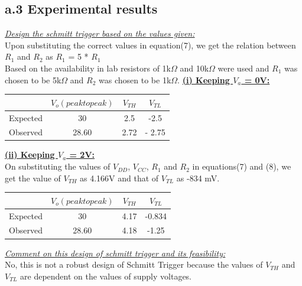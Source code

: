 \documentclass[12pt]{article}
\begin{document}
\subsection*{a.3 Experimental results}
\underline{\textit{Design the schmitt trigger based on the values given:}}\\
Upon substituting the correct values in equation(7), we get the relation between $R_{1}$ and $R_{2}$ as $R_{1}$ = 5 * $R_{1}$\\
Based on the availability in lab resistors of 1k$\Omega$ and 10k$\Omega$ were used and $R_{1}$ was chosen to be 5k$\Omega$ and $R_{2}$ was chosen to be 1k$\Omega$.
\underline{\textbf{(i) Keeping $V_{a}$ = 0V:}}\\
 \begin{table}[!hbt]
		\begin{center}
		\begin{tabular}{|c|c|c|c|} \hline
			& $V_{o} (peak to peak)$ & $V_{TH}$ & $V_{TL}$ \\ \hline
			Expected & 30 & 2.5 & -2.5 \\ \hline
            Observed & 28.60 & 2.72 & - 2.75 \\ \hline 
		\end{tabular}
		\end{center}
\end{table}

\underline{\textbf{(ii) Keeping $V_{a}$ = 2V:}}\\
On substituting the values of $V_{DD}$, $V_{CC}$, $R_{1}$ and $R_{2}$ in equations(7) and (8), we get the value of $V_{TH}$ as 4.166V and that of $V_{TL}$ as -834 mV.\\
 \begin{table}[!hbt]
		\begin{center}
		\begin{tabular}{|c|c|c|c|} \hline
			& $V_{o} (peak to peak)$ & $V_{TH}$ & $V_{TL}$ \\ \hline
			Expected & 30 & 4.17 & -0.834 \\ \hline
            Observed & 28.60 & 4.18 & -1.25 \\ \hline 
		\end{tabular}
		\end{center}
\end{table}

 \!\!\!\!\!\!\!\!\!\underline{\textit{Comment on this design of schmitt trigger and its feasibility:}}\\
No, this is not a robust design of Schmitt Trigger because the values of $V_{TH}$ and $V_{TL}$ are dependent on the values of supply voltages.
\end{document}
